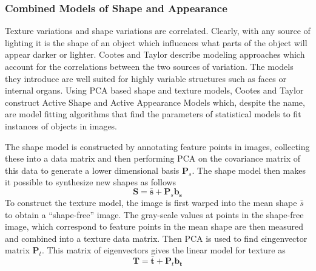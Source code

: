 \documentclass[11pt,a4paper,twoside]{report}
\begin{document}

\subsubsection{Combined Models of Shape and Appearance}
Texture variations and shape variations are correlated. Clearly, with any source of
lighting it is the shape of an object which influences what parts of the object
will appear darker or lighter. Cootes and Taylor \cite{activeApp04} describe modeling approaches
which account for the correlations between the two sources of
variation. The models they introduce are well suited for highly
variable structures such as faces or internal organs. Using PCA based shape and
texture models, Cootes and Taylor construct Active
Shape and Active Appearance Models which, despite the name, are model fitting
algorithms that find the parameters of statistical models to fit instances of objects in images.

The shape model is constructed by annotating feature points in
images, collecting these into a data matrix and then performing PCA on the
covariance matrix of this data to generate a lower dimensional basis
$\mathbf{P}_s$. The shape model then makes it possible to synthesize new shapes
as follows
\begin{equation}\label{eq:shape}
\mathbf{S} = \mathbf{\bar{s}} + \mathbf{P}_s\mathbf{b_s}
\end{equation}
To construct the texture model, the image is first warped into the mean shape
$\bar{s}$ to obtain a ``shape-free'' image. The gray-scale values at points in
the shape-free image, which correspond to feature points in the mean shape are then
measured and combined into a texture data matrix. Then PCA is used to find
eingenvector matrix $\mathbf{P}_t$. This matrix of eigenvectors gives the
linear model for texture as
\begin{equation}\label{eq:text}
\mathbf{T} = \mathbf{\bar{t}} + \mathbf{P}_t\mathbf{b_t}
\end{equation}
\end{document}
